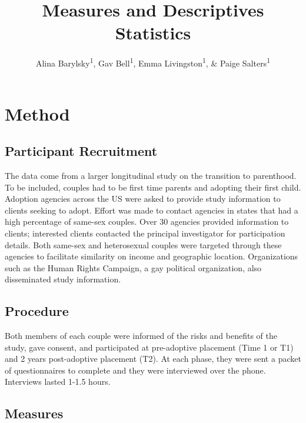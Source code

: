 \documentclass[man]{apa6}
\title{Measures and Descriptives Statistics}
\author{Alina Barylsky\textsuperscript{1}, Gav Bell\textsuperscript{1}, Emma Livingston\textsuperscript{1}, \& Paige Salters\textsuperscript{1}}
\date{}
\affiliation{
\vspace{0.5cm}
\textsuperscript{1} Smith College}
\begin{document}
\maketitle

\hypertarget{method}{%
\section{Method}\label{method}}

\hypertarget{participant-recruitment}{%
\subsection{Participant Recruitment}\label{participant-recruitment}}

The data come from a larger longitudinal study on the transition to parenthood. To be included, couples had to be first time parents and adopting their first child. Adoption agencies across the US were asked to provide study information to clients seeking to adopt. Effort was made to contact agencies in states that had a high percentage of same-sex couples. Over 30 agencies provided information to clients; interested clients contacted the principal investigator for participation details. Both same-sex and heterosexual couples were targeted through these agencies to facilitate similarity on income and geographic location. Organizations such as the Human Rights Campaign, a gay political organization, also disseminated study information.

\hypertarget{procedure}{%
\subsection{Procedure}\label{procedure}}

Both members of each couple were informed of the risks and benefits of the study, gave consent, and participated at pre-adoptive placement (Time 1 or T1) and 2 years post-adoptive placement (T2). At each phase, they were sent a packet of questionnaires to complete and they were interviewed over the phone. Interviews lasted 1-1.5 hours.

\hypertarget{measures}{%
\subsection{Measures}\label{measures}}
\end{document}
